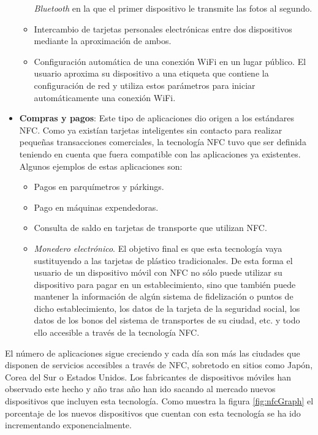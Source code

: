 \begin{itemize}
\begin{itemize}
  \emph{Bluetooth} en la que el primer dispositivo le transmite las fotos al
  segundo.
  \item Intercambio de tarjetas personales electrónicas entre dos dispositivos
  mediante la aproximación de ambos.
  \item Configuración automática de una conexión \acs{WiFi} en un lugar
  público. El usuario aproxima su dispositivo a una etiqueta que contiene la
  configuración de red y utiliza estos parámetros para iniciar automáticamente
  una conexión \acs{WiFi}.
  \end{itemize}
\item \textbf{Compras y pagos}:
Este tipo de aplicaciones dio origen a los estándares \acs{NFC}. Como ya
existían tarjetas inteligentes sin contacto para realizar pequeñas
transacciones comerciales, la tecnología \acs{NFC} tuvo que ser definida
teniendo en cuenta que fuera compatible con las aplicaciones ya existentes.
Algunos ejemplos de estas aplicaciones son:
  \begin{itemize}
  \item Pagos en parquímetros y párkings.
  \item Pago en máquinas expendedoras.
  \item Consulta de saldo en tarjetas de transporte que utilizan \acs{NFC}.
  \item \emph{Monedero electrónico}. El objetivo final es que esta tecnología
  vaya sustituyendo a las tarjetas de plástico tradicionales. De esta forma
  el usuario de un dispositivo móvil con \acs{NFC} no sólo puede utilizar su
  dispositivo para pagar en un establecimiento, sino que también puede
  mantener la información de algún sistema de fidelización o puntos de dicho
  establecimiento, los datos de la tarjeta de la seguridad social, los datos
  de los bonos del sistema de transportes de su ciudad, etc. y todo ello
  accesible a través de la tecnología \acs{NFC}.
  \end{itemize}
\end{itemize}

El número de aplicaciones sigue creciendo y cada día son más las ciudades
que disponen de servicios accesibles a través de \acs{NFC}, sobretodo en
sitios como Japón, Corea del Sur o Estados Unidos. Los fabricantes de
dispositivos móviles han observado este hecho y año tras año han ido
sacando al mercado nuevos dispositivos que incluyen esta tecnología.
Como muestra la figura \ref{fig:nfcGraph} el porcentaje de los nuevos
dispositivos que cuentan con esta tecnología se ha ido incrementando
exponencialmente.

